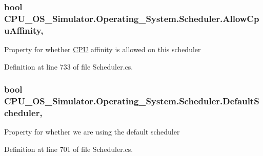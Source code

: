 \subsubsection[{Allow\+Cpu\+Affinity}]{\setlength{\rightskip}{0pt plus 5cm}bool C\+P\+U\+\_\+\+O\+S\+\_\+\+Simulator.\+Operating\+\_\+\+System.\+Scheduler.\+Allow\+Cpu\+Affinity\hspace{0.3cm}{\ttfamily [get]}, {\ttfamily [set]}}\label{class_c_p_u___o_s___simulator_1_1_operating___system_1_1_scheduler_a904a19345a3ceffa809aac3e0ad06321}


Property for whether \hyperlink{namespace_c_p_u___o_s___simulator_1_1_c_p_u}{C\+P\+U} affinity is allowed on this scheduler 



Definition at line 733 of file Scheduler.\+cs.

\hypertarget{class_c_p_u___o_s___simulator_1_1_operating___system_1_1_scheduler_acef6087d200a91657055a533ac0e3474}{}
\subsubsection[{Default\+Scheduler}]{\setlength{\rightskip}{0pt plus 5cm}bool C\+P\+U\+\_\+\+O\+S\+\_\+\+Simulator.\+Operating\+\_\+\+System.\+Scheduler.\+Default\+Scheduler\hspace{0.3cm}{\ttfamily [get]}, {\ttfamily [set]}}\label{class_c_p_u___o_s___simulator_1_1_operating___system_1_1_scheduler_acef6087d200a91657055a533ac0e3474}


Property for whether we are using the default scheduler 



Definition at line 701 of file Scheduler.\+cs.

\hypertarget{class_c_p_u___o_s___simulator_1_1_operating___system_1_1_scheduler_a7f0cc5668527496de0028013dae3be0c}{}
